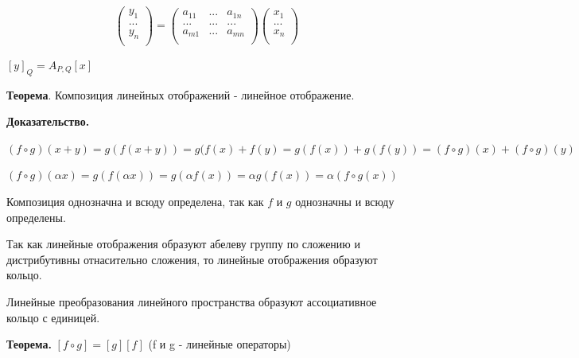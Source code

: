 \documentclass[a4paper]{article}
\begin{document}
\begin{equation}
\displaystyle \begin{pmatrix}
	y_1 \\
	... \\
	y_n\\
\end{pmatrix} = \begin{pmatrix}
	a_{11}& ...& a_{1n}\\
	...& ...& ...\\
	a_{m1}& ...& a_{mn}\\
\end{pmatrix} \begin{pmatrix}
	x_1 \\
	... \\
	x_n\\
\end{pmatrix}
\end{equation}

$\left[y \right]_Q = A_{P,Q} \left[ x \right]$

\begin{htheorem}
\textbf{Теорема}. Композиция линейных отображений - линейное отображение.
\end{htheorem}

\begin{hproof}
\textbf{Доказательство.} 

$(f \circ g)(x+y) = g(f(x+y)) = g(f(x) + f(y) = g(f(x)) + g(f(y)) = (f \circ g)(x) + (f \circ g)(y)$

$(f \circ g)(\alpha x) = g(f(\alpha x)) = g(\alpha f(x)) = \alpha g(f(x)) = \alpha (f \circ g(x))$
\end{hproof}

Композиция однозначна и всюду определена, так как $f$ и $g$ однозначны и всюду определены.

Так как линейные отображения образуют абелеву группу по сложению и дистрибутивны отнасительно сложения, то линейные отображения образуют кольцо.

Линейные преобразования линейного пространства образуют ассоциативное кольцо с единицей.

\begin{htheorem}
\textbf{Теорема.} $[f \circ g] = [g][f]$ (f и g - линейные операторы)
\end{htheorem}
\end{document}
